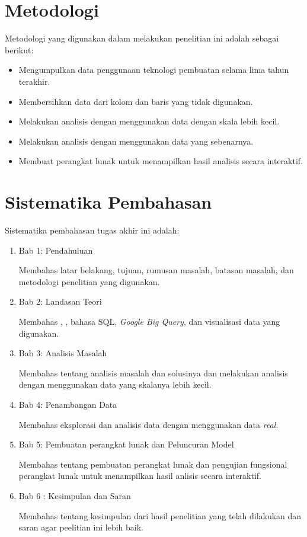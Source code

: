 \section{Metodologi}
\label{sec:metlit}
Metodologi yang digunakan dalam melakukan penelitian ini adalah sebagai berikut:
\begin{itemize}
    \item Mengumpulkan data penggunaan teknologi pembuatan \web selama lima tahun terakhir.
    \item Membersihkan data dari kolom dan baris yang tidak digunakan.
    \item Melakukan analisis dengan menggunakan data dengan skala lebih kecil.
    \item Melakukan analisis dengan menggunakan data yang sebenarnya.
    \item Membuat perangkat lunak untuk menampilkan hasil analisis secara interaktif.
\end{itemize}

\section{Sistematika Pembahasan}
\label{sec:sispem}
Sistematika pembahasan tugas akhir ini adalah:
\begin{enumerate}
    \item Bab 1: Pendahuluan
   
    Membahas latar belakang, tujuan, rumusan masalah, batasan masalah, dan metodologi penelitian yang digunakan.
    
    \item Bab 2: Landasan Teori

    Membahas \web, \http, bahasa SQL, \textit{Google Big Query}, dan visualisasi data yang digunakan.

    \item Bab 3: Analisis Masalah

    Membahas tentang analisis masalah dan solusinya dan melakukan analisis dengan menggunakan data yang skalanya lebih kecil.

    \item Bab 4: Penambangan Data
    
    Membahas eksplorasi dan analisis data dengan menggunakan data \textit{real}.

    \item Bab 5: Pembuatan perangkat lunak dan Peluncuran Model

    Membahas tentang pembuatan perangkat lunak dan pengujian fungsional perangkat lunak untuk menampilkan hasil anlisis secara interaktif.

    \item Bab 6 : Kesimpulan dan Saran

    Membahas tentang kesimpulan dari hasil penelitian yang telah dilakukan dan saran agar peelitian ini lebih baik.
\end{enumerate}
